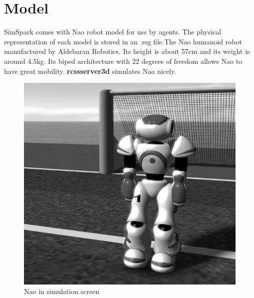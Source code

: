 \section{Model}
SimSpark comes with Nao robot model for use by agents. The physical representation of each model is stored in an .rsg file.The Nao humanoid robot manufactured by Aldebaran Robotics. Its height is about 57cm and its weight is around 4.5kg. Its biped architecture with 22 degrees of freedom allows Nao to have great mobility. { \bf rcssserver3d} simulates Nao nicely.
\begin{figure}[ht]
\centering
  \includegraphics[scale=0.3]{Chapter2/figures/629px-Models-nao.jpg}
  \caption{Nao in simulation screen} 
  \label{fig:Naoinsimulationscreen}
\end{figure}